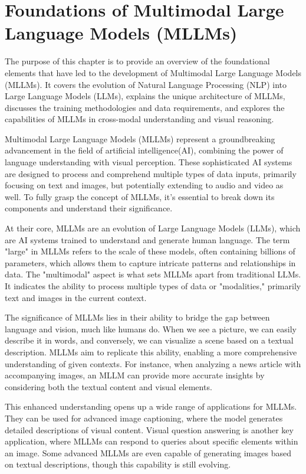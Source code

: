 \chapter{Foundations of Multimodal Large Language Models (MLLMs)}
The purpose of this chapter is to provide an overview of the foundational elements that have led to the development of Multimodal Large Language Models (MLLMs). It covers the evolution of Natural Language Processing (NLP) into Large Language Models (LLMs), explains the unique architecture of MLLMs, discusses the training methodologies and data requirements, and explores the capabilities of MLLMs in cross-modal understanding and visual reasoning.

Multimodal Large Language Models (MLLMs) represent a groundbreaking advancement in the field of artificial intelligence(AI), combining the power of language understanding with visual perception. These sophisticated AI systems are designed to process and comprehend multiple types of data inputs, primarily focusing on text and images, but potentially extending to audio and video as well. To fully grasp the concept of MLLMs, it's essential to break down its components and understand their significance.

At their core, MLLMs are an evolution of Large Language Models (LLMs), which are AI systems trained to understand and generate human language. The term "large" in MLLMs refers to the scale of these models, often containing billions of parameters, which allows them to capture intricate patterns and relationships in data. The "multimodal" aspect is what sets MLLMs apart from traditional LLMs. It indicates the ability to process multiple types of data or "modalities," primarily text and images in the current context.

The significance of MLLMs lies in their ability to bridge the gap between language and vision, much like humans do. When we see a picture, we can easily describe it in words, and conversely, we can visualize a scene based on a textual description. MLLMs aim to replicate this ability, enabling a more comprehensive understanding of given contexts. For instance, when analyzing a news article with accompanying images, an MLLM can provide more accurate insights by considering both the textual content and visual elements.

This enhanced understanding opens up a wide range of applications for MLLMs. They can be used for advanced image captioning, where the model generates detailed descriptions of visual content. Visual question answering is another key application, where MLLMs can respond to queries about specific elements within an image. Some advanced MLLMs are even capable of generating images based on textual descriptions, though this capability is still evolving.

